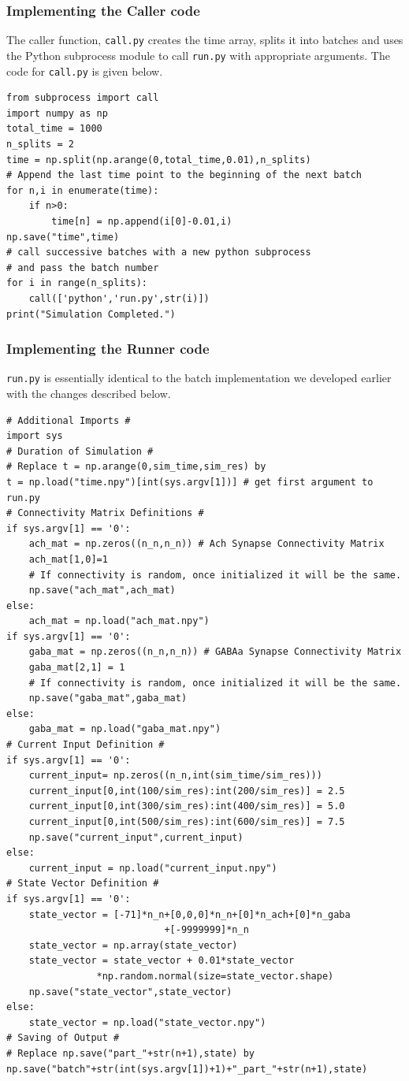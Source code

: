 \documentclass[10pt,letterpaper]{article}
\begin{document}
\subsubsection*{Implementing the Caller code}
The caller function, \texttt{call.py} creates the time array, splits it into batches and uses the Python subprocess module to call \texttt{run.py} with appropriate arguments. The code for \texttt{call.py} is given below.

\begin{verbatim}
from subprocess import call
import numpy as np
total_time = 1000
n_splits = 2
time = np.split(np.arange(0,total_time,0.01),n_splits)
# Append the last time point to the beginning of the next batch
for n,i in enumerate(time):
    if n>0:
        time[n] = np.append(i[0]-0.01,i)
np.save("time",time)
# call successive batches with a new python subprocess 
# and pass the batch number
for i in range(n_splits):
    call(['python','run.py',str(i)])
print("Simulation Completed.")
\end{verbatim}

\subsubsection*{Implementing the Runner code}

\texttt{run.py} is essentially identical to the batch implementation we developed earlier with the changes described below.

\begin{verbatim}
# Additional Imports #
import sys
# Duration of Simulation #
# Replace t = np.arange(0,sim_time,sim_res) by
t = np.load("time.npy")[int(sys.argv[1])] # get first argument to run.py
# Connectivity Matrix Definitions #
if sys.argv[1] == '0':
    ach_mat = np.zeros((n_n,n_n)) # Ach Synapse Connectivity Matrix
    ach_mat[1,0]=1
    # If connectivity is random, once initialized it will be the same.
    np.save("ach_mat",ach_mat)
else:
    ach_mat = np.load("ach_mat.npy")
if sys.argv[1] == '0':
    gaba_mat = np.zeros((n_n,n_n)) # GABAa Synapse Connectivity Matrix
    gaba_mat[2,1] = 1
    # If connectivity is random, once initialized it will be the same.
    np.save("gaba_mat",gaba_mat)
else:
    gaba_mat = np.load("gaba_mat.npy")
# Current Input Definition #
if sys.argv[1] == '0':
    current_input= np.zeros((n_n,int(sim_time/sim_res)))
    current_input[0,int(100/sim_res):int(200/sim_res)] = 2.5
    current_input[0,int(300/sim_res):int(400/sim_res)] = 5.0
    current_input[0,int(500/sim_res):int(600/sim_res)] = 7.5
    np.save("current_input",current_input)
else:
    current_input = np.load("current_input.npy")
# State Vector Definition #
if sys.argv[1] == '0':
    state_vector = [-71]*n_n+[0,0,0]*n_n+[0]*n_ach+[0]*n_gaba
    						+[-9999999]*n_n
    state_vector = np.array(state_vector)
    state_vector = state_vector + 0.01*state_vector
    			*np.random.normal(size=state_vector.shape)
    np.save("state_vector",state_vector)
else:
    state_vector = np.load("state_vector.npy")
# Saving of Output #
# Replace np.save("part_"+str(n+1),state) by
np.save("batch"+str(int(sys.argv[1])+1)+"_part_"+str(n+1),state)
\end{verbatim}
\end{document}
